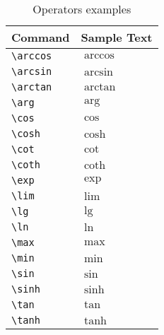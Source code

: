 \documentclass[a4paper,12pt,titlepage]{article}
\begin{document}
\begin{table}[H]
\center
	\begin{tabular}{l|l}
	\hline
	\textbf{Command} & \textbf{Sample Text} \\
	\hline
	\hline
	
	\verb|\arccos| & $\arccos$ \\
	\verb|\arcsin| & $\arcsin$ \\
	\verb|\arctan| & $\arctan$ \\
	\verb|\arg| & $\arg$ \\
	\verb|\cos| & $\cos$  \\
	\verb|\cosh| &  $\cosh$\\
	\verb|\cot| &  $\cot$\\
	\verb|\coth| & $\coth$\\
	\verb|\exp| &  $\exp$\\
	\verb|\lim| & $\lim$\\
	\verb|\lg| & $\lg$\\
	\verb|\ln| & $\ln$\\
	\verb|\max| & $\max$\\
	\verb|\min| & $\min$\\
	\verb|\sin| & $\sin$\\
	\verb|\sinh | & $\sinh$  \\
	\verb|\tan | & $\tan$  \\
	\verb|\tanh | & $\tanh$  \\

	\end{tabular}
	\caption{Operators examples}
\end{table}
\end{document}
